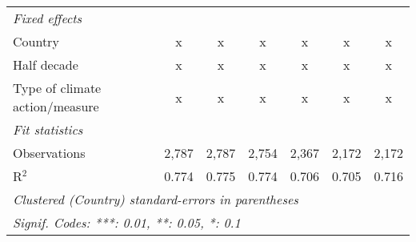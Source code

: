 \begin{tabular}{lcccccc}
   \emph{Fixed effects}\\
   Country                                           & x       & x       & x       & x             & x             & x\\  
   Half decade                                       & x       & x       & x       & x             & x             & x\\  
   Type of climate action/measure                    & x       & x       & x       & x             & x             & x\\  
   \midrule \emph{Fit statistics}\\
   Observations                                      & 2,787   & 2,787   & 2,754   & 2,367         & 2,172         & 2,172\\  
   R$^2$                                             & 0.774   & 0.775   & 0.774   & 0.706         & 0.705         & 0.716\\  
   \midrule
   \multicolumn{7}{l}{\emph{Clustered (Country) standard-errors in parentheses}}\\
   \multicolumn{7}{l}{\emph{Signif. Codes: ***: 0.01, **: 0.05, *: 0.1}}\\
\end{tabular}
\par\endgroup


